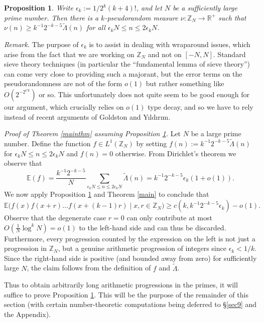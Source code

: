 \documentclass[12pt,a4paper,reqno]{amsart}
\numberwithin{equation}{section}
\theoremstyle{plain}
\newtheorem{proposition}[subsection]{Proposition}
\theoremstyle{definition}
\renewcommand{\leq}{\leqslant}
\renewcommand{\geq}{\geqslant}
\def\Z{{\mathbb Z}}
\def\E{{\mathbb E}}
\def\R{{\mathbb R}}
\def\vs{\vspace{11pt}}
\def\ni{\noindent}
\def\endproof{\hfill{\usebox{\proofbox}}}
\begin{document}
\begin{proposition}\label{prime-majorant}
Write $\epsilon_k := 1/2^{k}(k+4)!$, and let $N$ be a sufficiently large prime number.  Then
there is a $k$-pseudorandom measure $\nu : \mathbb{Z}_N \rightarrow \R^+$ such that $\nu(n) \geq k^{-1}2^{-k-5}\widetilde{\Lambda}(n)$ for all 
$\epsilon_k N \leq n \leq 2 \epsilon_k N$.
\end{proposition}

\noindent\textit{Remark.} The purpose of $\epsilon_k$ is to assist in dealing with wraparound issues, which arise from the fact that we are working on $\mathbb{Z}_N$ and not on $[-N,N]$.  Standard sieve theory techniques (in particular the ``fundamental
lemma of sieve theory'') can come very close to providing such a majorant, but the error terms on the pseudorandomness are not
of the form $o(1)$ but rather something like $O(2^{-2^{Ck}})$ or so.  This unfortunately does not quite seem to be good
enough for our argument, which crucially relies on $o(1)$ type decay, and so we have to rely instead of recent arguments of
Goldston and Y{\i}ld{\i}r{\i}m.

\noindent\textit{Proof of Theorem \ref{mainthm} assuming Proposition \ref{prime-majorant}.} 
Let $N$ be a large prime number.  Define the function $f \in L^1(\Z_N)$ by setting $f(n) := 
k^{-1}2^{-k-5}\tilde{\Lambda}(n)$ for $\epsilon_k N \leq n \leq 2\epsilon_k N$ and $f(n) = 0$ otherwise. From Dirichlet's theorem we observe that
$$ \E(f) = \frac{k^{-1}2^{-k-5}}{N} \sum_{\epsilon_k N \leq n \leq 2 \epsilon_k N} \tilde \Lambda(n)
= k^{-1}2^{-k-5} \epsilon_k (1 + o(1)).$$
We now apply Proposition \ref{prime-majorant} and Theorem \ref{main} to conclude that
$$\mathbb{E} \big( f(x)f(x+r) \dots f(x + (k-1)r) \; \big| \; x,r \in \mathbb{Z}_N\big) \geq c(k,k^{-1}2^{-k-5} \epsilon_k) - o(1).$$
Observe that the degenerate case $r=0$ can only contribute at most $O(\frac{1}{N} \log^k N) = o(1)$ to the left-hand side and can
thus be discarded. Furthermore, every progression counted by the expression on the left is not just a progression in $\mathbb{Z}_N$, but a genuine arithmetic progression of integers since $\epsilon_k < 1/k$.  Since the right-hand side is positive (and bounded away from
zero) for sufficiently large $N$, the claim follows from the definition of $f$
and $\tilde \Lambda$.
\endproof\vspace{11pt}

\ni Thus to obtain arbitrarily long arithmetic progressions in the primes, it will suffice to prove Proposition \ref{prime-majorant}.
This will be the purpose of the remainder of this section (with certain number-theoretic computations being deferred to \S \ref{sec9} and the Appendix).\vs
\end{document}
